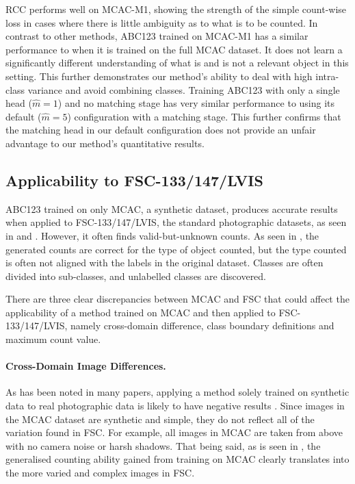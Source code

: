 \documentclass[../thesis.tex]{subfiles}
\begin{document}
RCC performs well on MCAC-M1, showing the strength of the simple count-wise loss in cases where there is little ambiguity as to what is to be counted.
In contrast to other methods, ABC123 trained on MCAC-M1 has a similar performance to when it is trained on the full MCAC dataset. 
It does not learn a significantly different understanding of what is and is not a relevant object in this setting. 
This further demonstrates our method's ability to deal with high intra-class variance and avoid combining classes. 
Training ABC123 with only a single head ($\hat{m}=1$) and no matching stage has very similar performance to using its default ($\hat{m}=5$) configuration with a matching stage. 
This further confirms that the matching head in our default configuration does not provide an unfair advantage to our method's quantitative results.

\subsection{Applicability to FSC-133/147/LVIS}\label{sec__ABC123__fscresults}

ABC123 trained on only MCAC, a synthetic dataset, produces accurate results when applied to FSC-133/147/LVIS, the standard photographic datasets,  as seen in  and  . 
However, it often finds valid-but-unknown counts. As seen in , the generated counts are correct for the type of object counted, but the type counted is often not aligned with the labels in the original dataset. Classes are often divided into sub-classes, and unlabelled classes are discovered.


There are three clear discrepancies between MCAC and FSC that could affect the applicability of a method trained on MCAC and then applied to FSC-133/147/LVIS, namely cross-domain difference, class boundary definitions and maximum count value.

\paragraph{Cross-Domain Image Differences.} As has been noted in many papers, applying a method solely trained on synthetic data to real photographic data is likely to have negative results \cite{lu2023machine}. 
Since images in the MCAC dataset are synthetic and simple, they do not reflect all of the variation found in FSC. For example, all images in MCAC are taken from above with no camera noise or harsh shadows. That being said, as is seen in , the generalised counting ability gained from training on MCAC clearly translates into the more varied and complex images in FSC.
\end{document}

